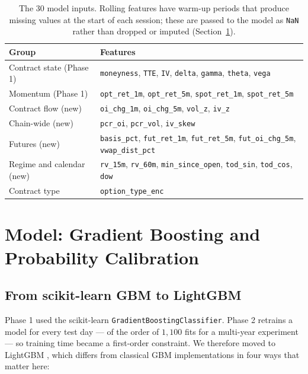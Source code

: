 \documentclass[11pt,a4paper]{article}
\newcommand{\code}[1]{\texttt{#1}}
\begin{document}
\begin{table}[H]
\centering\small
\begin{tabular}{@{}lp{10.2cm}@{}}
\toprule
\textbf{Group} & \textbf{Features}\\
\midrule
Contract state (Phase 1) & \code{moneyness}, \code{TTE}, \code{IV}, \code{delta},
\code{gamma}, \code{theta}, \code{vega}\\
Momentum (Phase 1)       & \code{opt\_ret\_1m}, \code{opt\_ret\_5m},
\code{spot\_ret\_1m}, \code{spot\_ret\_5m}\\
Contract flow (new)      & \code{oi\_chg\_1m}, \code{oi\_chg\_5m}, \code{vol\_z}, \code{iv\_z}\\
Chain-wide (new)         & \code{pcr\_oi}, \code{pcr\_vol}, \code{iv\_skew}\\
Futures (new)            & \code{basis\_pct}, \code{fut\_ret\_1m}, \code{fut\_ret\_5m},
\code{fut\_oi\_chg\_5m}, \code{vwap\_dist\_pct}\\
Regime and calendar (new)& \code{rv\_15m}, \code{rv\_60m}, \code{min\_since\_open},
\code{tod\_sin}, \code{tod\_cos}, \code{dow}\\
Contract type            & \code{option\_type\_enc}\\
\bottomrule
\end{tabular}
\caption{The 30 model inputs. Rolling features have warm-up periods that produce missing
values at the start of each session; these are passed to the model as \code{NaN} rather
than dropped or imputed (Section~\ref{sec:model}).}
\label{tab:features}
\end{table}

\section{Model: Gradient Boosting and Probability Calibration}\label{sec:model}

\subsection{From scikit-learn GBM to LightGBM}

Phase 1 used the scikit-learn \code{GradientBoostingClassifier}. Phase 2 retrains a model
for every test day --- of the order of $1{,}100$ fits for a multi-year experiment --- so
training time became a first-order constraint. We therefore moved to LightGBM
\cite{lightgbm}, which differs from classical GBM implementations in four ways that
matter here:
\end{document}
